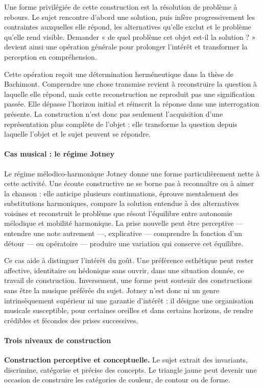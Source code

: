 \documentclass[10pt,a4paper]{article}
\begin{document}
Une forme privilégiée de cette construction est la résolution de problème à rebours. Le sujet rencontre d'abord une solution, puis infère progressivement les contraintes auxquelles elle répond, les alternatives qu'elle exclut et le problème qu'elle rend visible. Demander « de quel problème cet objet est-il la solution ? » devient ainsi une opération générale pour prolonger l'intérêt et transformer la perception en compréhension.

Cette opération reçoit une détermination herméneutique dans la thèse de Bachimont. Comprendre une chose transmise revient à reconstruire la question à laquelle elle répond, mais cette reconstruction ne reproduit pas une signification passée. Elle dépasse l'horizon initial et réinscrit la réponse dans une interrogation présente. La construction n'est donc pas seulement l'acquisition d'une représentation plus complète de l'objet : elle transforme la question depuis laquelle l'objet et le sujet peuvent se répondre.

\paragraph{Cas musical : le régime Jotney}
Le régime mélodico-harmonique Jotney donne une forme particulièrement nette à cette activité. Une écoute constructive ne se borne pas à reconnaître ou à aimer la chanson : elle anticipe plusieurs continuations, éprouve mentalement des substitutions harmoniques, compare la solution entendue à des alternatives voisines et reconstruit le problème que résout l'équilibre entre autonomie mélodique et mobilité harmonique. La prise nouvelle peut être perceptive — entendre une note autrement —, explicative — comprendre la fonction d'un détour — ou opératoire — produire une variation qui conserve cet équilibre.

Ce cas aide à distinguer l'intérêt du goût. Une préférence esthétique peut rester affective, identitaire ou hédonique sans ouvrir, dans une situation donnée, ce travail de construction. Inversement, une forme peut soutenir des constructions sans être la musique préférée du sujet. Jotney n'est donc ni un genre intrinsèquement supérieur ni une garantie d'intérêt : il désigne une organisation musicale susceptible, pour certaines oreilles et dans certains horizons, de rendre crédibles et fécondes des prises successives.

\paragraph{Trois niveaux de construction}
\textbf{Construction perceptive et conceptuelle.} Le sujet extrait des invariants, discrimine, catégorise et précise des concepts. Le triangle jaune peut devenir une occasion de construire les catégories de couleur, de contour ou de forme.
\end{document}
